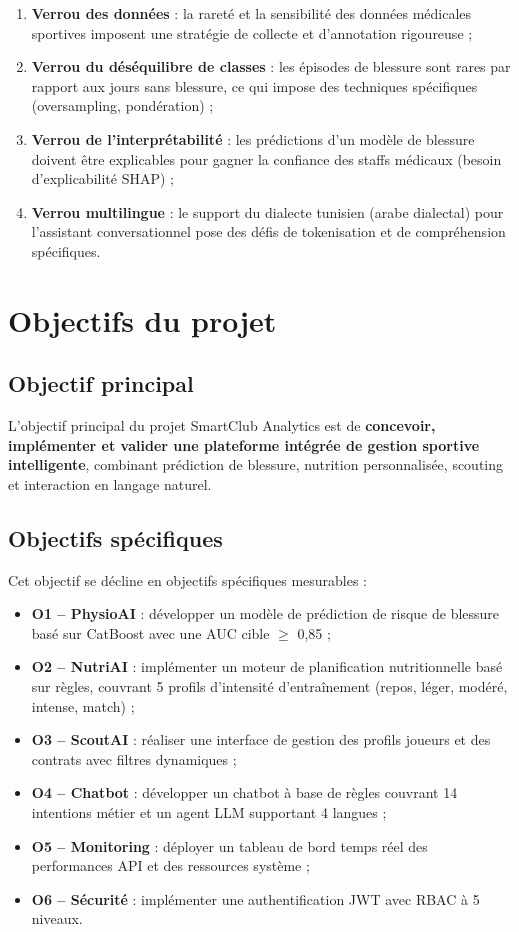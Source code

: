 \begin{enumerate}
    \item \textbf{Verrou des données} : la rareté et la sensibilité des données médicales sportives imposent une stratégie de collecte et d'annotation rigoureuse ;
    \item \textbf{Verrou du déséquilibre de classes} : les épisodes de blessure sont rares par rapport aux jours sans blessure, ce qui impose des techniques spécifiques (oversampling, pondération) ;
    \item \textbf{Verrou de l'interprétabilité} : les prédictions d'un modèle de blessure doivent être explicables pour gagner la confiance des staffs médicaux (besoin d'explicabilité SHAP) ;
    \item \textbf{Verrou multilingue} : le support du dialecte tunisien (arabe dialectal) pour l'assistant conversationnel pose des défis de tokenisation et de compréhension spécifiques.
\end{enumerate}

\section{Objectifs du projet}

\subsection{Objectif principal}

L'objectif principal du projet SmartClub Analytics est de \textbf{concevoir, implémenter et valider une plateforme intégrée de gestion sportive intelligente}, combinant prédiction de blessure, nutrition personnalisée, scouting et interaction en langage naturel.

\subsection{Objectifs spécifiques}

Cet objectif se décline en objectifs spécifiques mesurables :

\begin{itemize}
    \item \textbf{O1 -- PhysioAI} : développer un modèle de prédiction de risque de blessure basé sur CatBoost avec une AUC cible $\geq$ 0,85 ;
    \item \textbf{O2 -- NutriAI} : implémenter un moteur de planification nutritionnelle basé sur règles, couvrant 5 profils d'intensité d'entraînement (repos, léger, modéré, intense, match) ;
    \item \textbf{O3 -- ScoutAI} : réaliser une interface de gestion des profils joueurs et des contrats avec filtres dynamiques ;
    \item \textbf{O4 -- Chatbot} : développer un chatbot à base de règles couvrant 14 intentions métier et un agent LLM supportant 4 langues ;
    \item \textbf{O5 -- Monitoring} : déployer un tableau de bord temps réel des performances API et des ressources système ;
    \item \textbf{O6 -- Sécurité} : implémenter une authentification JWT avec RBAC à 5 niveaux.
\end{itemize}

